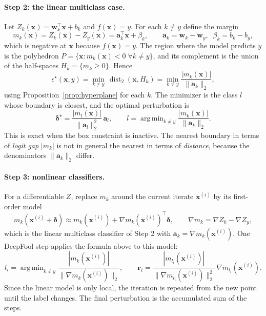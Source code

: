\documentclass[10pt,a4paper]{extarticle}
\theoremstyle{definition}
\newcommand{\x}{\mathbf{x}}
\newcommand{\bdelta}{\boldsymbol{\delta}}
\DeclareMathOperator*{\argmin}{arg\,min}
\begin{document}
\paragraph{Step 2: the linear multiclass case.} Let \(Z_k(\x)=\mathbf{w}_k^\top\x+b_k\) and \(f(\x)=y\). For each \(k\neq y\) define the margin
\[
m_k(\x)=Z_k(\x)-Z_y(\x)=\mathbf{a}_k^\top\x+\beta_k,\qquad \mathbf{a}_k=\mathbf{w}_k-\mathbf{w}_y,\;\; \beta_k=b_k-b_y,
\]
which is negative at \(\x\) because \(f(\x)=y\). The region where the model predicts \(y\) is the polyhedron \(P=\{\x: m_k(\x)<0\;\forall k\neq y\}\), and its complement is the union of the half-spaces \(H_k=\{m_k\ge0\}\). Hence
\begin{equation}\label{eq:dfnearest}
\epsilon^\star(\x,y)=\min_{k\neq y}\,\operatorname{dist}_2(\x,H_k)=\min_{k\neq y}\frac{|m_k(\x)|}{\|\mathbf{a}_k\|_2},
\end{equation}
using Proposition~\ref{prop:hyperplane} for each \(k\). The minimizer is the class \(l\) whose boundary is closest, and the optimal perturbation is
\[
\bdelta^\star=\frac{|m_l(\x)|}{\|\mathbf{a}_l\|_2^2}\,\mathbf{a}_l,\qquad l=\argmin_{k\neq y}\frac{|m_k(\x)|}{\|\mathbf{a}_k\|_2}.
\]
This is exact when the box constraint is inactive. The nearest boundary in terms of \emph{logit gap} \(|m_k|\) is not in general the nearest in terms of \emph{distance}, because the denominators \(\|\mathbf{a}_k\|_2\) differ.

\paragraph{Step 3: nonlinear classifiers.} For a differentiable \(Z\), replace \(m_k\) around the current iterate \(\x^{(i)}\) by its first-order model
\[
m_k(\x^{(i)}+\bdelta)\approx m_k(\x^{(i)})+\nabla m_k(\x^{(i)})^\top\bdelta,\qquad \nabla m_k=\nabla Z_k-\nabla Z_y,
\]
which is the linear multiclass classifier of Step 2 with \(\mathbf{a}_k=\nabla m_k(\x^{(i)})\). One DeepFool step applies the formula above to this model:
\begin{equation}\label{eq:dfstep}
l_i=\argmin_{k\neq y}\frac{|m_k(\x^{(i)})|}{\|\nabla m_k(\x^{(i)})\|_2},\qquad
\mathbf{r}_i=\frac{|m_{l_i}(\x^{(i)})|}{\|\nabla m_{l_i}(\x^{(i)})\|_2^2}\,\nabla m_{l_i}(\x^{(i)}).
\end{equation}
Since the linear model is only local, the iteration is repeated from the new point until the label changes. The final perturbation is the accumulated sum of the steps.
\end{document}

